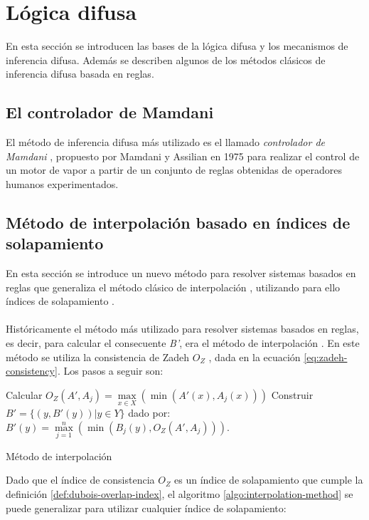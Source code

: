 \chapter{Lógica difusa}
\label{cha:logica-difusa}
En esta sección se introducen las bases de la lógica difusa y los mecanismos de inferencia difusa. Además se describen algunos de los métodos clásicos de inferencia difusa basada en reglas.
\section{El controlador de Mamdani}
El método de inferencia difusa más utilizado es el llamado \emph{controlador de Mamdani} \cite{Mamdani1975}, propuesto por Mamdani y Assilian en 1975 para realizar el control de un motor de vapor a partir de un conjunto de reglas obtenidas de operadores humanos experimentados.
\section{Método de interpolación basado en índices de solapamiento}
En esta sección se introduce un nuevo método para resolver sistemas basados en reglas que generaliza el método clásico de interpolación , utilizando para ello índices de solapamiento \cite{bustince2013overlap}.\\
\\
Históricamente el método más utilizado para resolver sistemas basados en reglas, es decir, para calcular el consecuente \emph{B'}, era el método de interpolación \cite{klir1987}. En este método se utiliza la consistencia de Zadeh \emph{$O_{Z}$} \cite{zadeh1978}, dada en la ecuación \ref{eq:zadeh-consistency}. Los pasos a seguir son:

\begin{algorithm}
\DontPrintSemicolon
{}
\vspace{0.4 cm}
 {
Calcular $O_{Z}(A',A_{j}) = \max\limits_{x \in X}(\min(A'(x),A_{j}(x))) $
}
Construir $B' = \{(y, B'(y))|y \in Y\}$ dado por: \\
\centering
\nonl $B'(y) = \max\limits_{j=1}^{n}(\min(B_{j}(y),O_{Z}(A', A_{j})))$.\\
\;
\caption{Método de interpolación}
\label{algo:interpolation-method}
\end{algorithm}
Dado que el índice de consistencia $O_{Z}$ es un índice de solapamiento que cumple la definición \ref{def:dubois-overlap-index}, el algoritmo \ref{algo:interpolation-method} se puede generalizar para utilizar cualquier índice de solapamiento:


